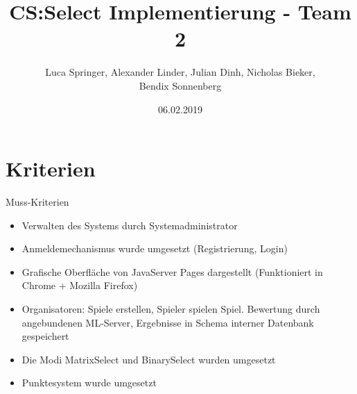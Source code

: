 \documentclass[xcolor=dvipsnames]{beamer}
\title[Team 2 - Implementierung]{CS:Select Implementierung - Team 2}
\author{Luca Springer, Alexander Linder, Julian Dinh, Nicholas Bieker,\\ Bendix Sonnenberg}
\date{06.02.2019}
\begin{document}
\begin{frame} %
  \titlepage
\end{frame}

\section{Kriterien}

\begin{frame}{Muss-Kriterien}
  \begin{itemize}
    \item Verwalten des Systems durch Systemadministrator \\
    \item Anmeldemechanismus wurde umgesetzt (Registrierung, Login) \\
    \item Grafische Oberfläche von JavaServer Pages dargestellt (Funktioniert in Chrome + Mozilla Firefox) \\
    \item Organisatoren: Spiele erstellen, Spieler spielen Spiel. Bewertung durch angebundenen ML-Server, Ergebnisse in Schema interner Datenbank gespeichert \\
    \item Die Modi MatrixSelect und BinarySelect wurden umgesetzt \\
    \item Punktesystem wurde umgesetzt \\
  \end{itemize}
\end{frame}
\end{document}
